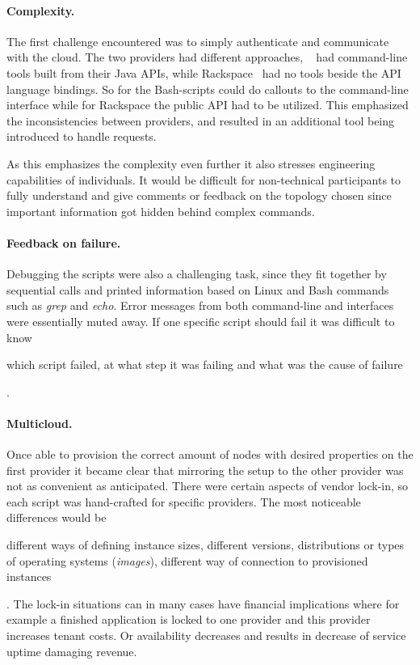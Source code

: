 \paragraph{Complexity.} 

The first challenge encountered was to simply 
authenticate and communicate with the cloud. 
The two providers had different approaches, ~\cite{aws} 
had command-line tools built from their Java APIs,
while Rackspace~\cite{rackspace} had no tools beside the API language bindings.
So for  the Bash-scripts could do callouts to the command-line interface 
while for Rackspace the public  API had to be utilized.
This emphasized the inconsistencies between providers, 
and resulted in an additional tool being introduced to handle requests.

As this emphasizes the complexity even further it also stresses engineering 
capabilities of individuals.
It would be difficult for non-technical participants to fully understand and give comments
or feedback on the topology chosen since important information got hidden behind
complex commands.

\paragraph{Feedback on failure.}
Debugging the scripts were also a challenging task, since they fit together by
sequential calls and printed information based on Linux and Bash commands such as 
\emph{grep} and \emph{echo}.
Error messages from both command-line and  interfaces were essentially muted away.
If one specific script should fail it was difficult to know 
\begin{ii}
  \iitem which script failed, 
  \iitem at what step it was failing and 
  \iitem what was the cause of failure
\end{ii}.

\paragraph{Multicloud.}

Once able to provision the correct amount of nodes with desired properties
on the first provider it became clear that mirroring the setup to the other provider 
was not as convenient as anticipated.
There were certain aspects of vendor lock-in, so each script was hand-crafted for specific providers.
The most noticeable differences would be
\begin{ii}
  \iitem different ways of defining instance sizes,
  \iitem different versions, distributions or types of operating systems (\emph{images}),
  \iitem different way of connection to provisioned instances
\end{ii}.
The lock-in situations can in many cases have financial implications where for example
a finished application is locked to one provider and this provider increases tenant costs.
Or availability decreases and results in decrease of service uptime damaging revenue.

